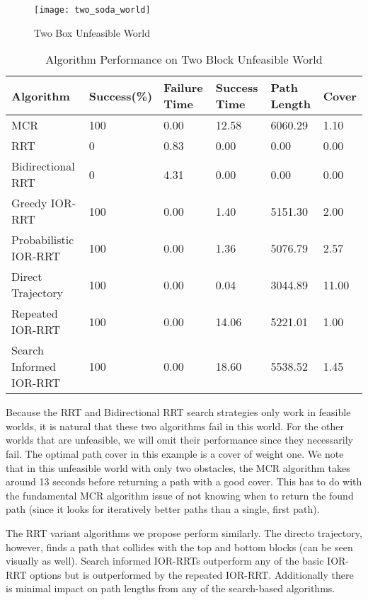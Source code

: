 \begin{figure}[h!]
    \centering
    \texttt{[image: two\_soda\_world]}
    \caption{Two Box Unfeasible World}
    \label{fig:two_soda_world}
\end{figure}

\begin{table}[h!]
\centering
\begin{tabular}{@{}llllll@{}}
\toprule
Algorithm & Success(\%)  & Failure Time  & Success Time  & Path Length & Cover\\ 
\midrule
MCR & 100 & 0.00 & 12.58 & 6060.29 & 1.10 \\
RRT & 0 & 0.83 & 0.00 & 0.00 & 0.00 \\
Bidirectional RRT & 0 & 4.31 & 0.00 & 0.00 & 0.00 \\
Greedy IOR-RRT & 100 & 0.00 & 1.40 & 5151.30 & 2.00 \\
Probabilistic IOR-RRT & 100 & 0.00 & 1.36 & 5076.79 & 2.57 \\
Direct Trajectory & 100 & 0.00 & 0.04 & 3044.89 & 11.00 \\
Repeated IOR-RRT & 100 & 0.00 & 14.06 & 5221.01 & 1.00 \\
Search Informed IOR-RRT & 100 & 0.00 & 18.60 & 5538.52 & 1.45 \\
\bottomrule
\end{tabular}
\caption{Algorithm Performance on Two Block Unfeasible World}
\label{tab:two_soda_world}
\end{table}

Because the RRT and Bidirectional RRT search strategies only work in feasible worlds, it is natural that these two algorithms fail in this world. For the other worlds that are unfeasible, we will omit their performance since they necessarily fail. The optimal path cover in this example is a cover of weight one. We note that in this unfeasible world with only two obstacles, the MCR algorithm takes around 13 seconds before returning a path with a good cover. This has to do with the fundamental MCR algorithm issue of not knowing when to return the found path (since it looks for iteratively better paths than a single, first path). 

The RRT variant algorithms we propose perform similarly. The directo trajectory, however, finds a path that collides with the top and bottom blocks (can be seen visually as well). Search informed IOR-RRTs outperform any of the basic IOR-RRT options but is outperformed by the repeated IOR-RRT. Additionally there is minimal impact on path lengths from any of the search-based algorithms.

